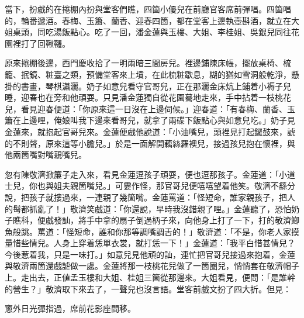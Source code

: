 當下，扮戲的在捲棚內扮與堂客們瞧，四箇小優兒在前廳官客席前彈唱。四箇唱的，輪番遞酒。春梅、玉簫、蘭香、迎春四箇，都在堂客上邊執壺斟酒，就立在大姐桌頭，同吃湯飯點心。吃了一回，潘金蓮與玉樓、大姐、李桂姐、吳銀兒同往花園裡打了回鞦韆。

原來捲棚後邊，西門慶收拾了一明兩暗三間房兒。裡邊鋪陳床帳，擺放桌椅、梳籠、抿鏡、粧臺之類，預備堂客來上墳，在此梳粧歇息，糊的猶如雪洞般乾淨，懸掛的書畫，琴棋瀟灑。奶子如意兒看守官哥兒，正在那灑金床炕上鋪着小褥子兒睡，迎春也在旁和他頑耍。只見潘金蓮獨自從花園驀地走來，手中拈着一枝桃花兒，{}看見迎春便道：「你原來這一日沒在上邊伺候。」迎春道：「有春梅、蘭香、玉簫在上邊哩，俺娘叫我下邊來看哥兒，就拿了兩碟下飯點心與如意兒吃。」奶子見金蓮來，就抱起官哥兒來。金蓮便戲他說道：「小油嘴兒，頭裡見打起鑼鼓來，諕的不則聲，原來這等小膽兒。」於是一面解開藕絲羅襖兒，接過孩兒抱在懷裡，與他兩箇嘴對嘴親嘴兒。

忽有陳敬濟掀簾子走入來，看見金蓮逗孩子頑耍，便也逗那孩子。金蓮道：「小道士兒，你也與姐夫親箇嘴兒。」可霎作怪，那官哥兒便嘻嘻望着他笑。{}敬濟不繇分說，把孩子就摟過來，一連親了幾箇嘴。金蓮罵道：「怪短命，誰家親孩子，把人的髩都抓亂了！」敬濟笑戲道：「你還說，早時我沒錯親了哩。」{}金蓮聽了，恐怕奶子瞧科，便戲發訕，將手中拿的扇子倒過柄子來，向他身上打了一下，打的敬濟鯽魚般跳。罵道：「怪短命，誰和你那等調嘴調舌的！」敬濟道：「不是，你老人家摸量惜些情兒。人身上穿着恁單衣裳，就打恁一下！」金蓮道：「我平白惜甚情兒？今後惹着我，只是一味打。」{}如意兒見他頑的訕，連忙把官哥兒接過來抱着，金蓮與敬濟兩箇還戲謔做一處。金蓮將那一枝桃花兒做了一箇圈兒，悄悄套在敬濟帽子上。{}走出去，正値孟玉樓和大姐、桂姐三箇從那邊來。大姐看見，便問：「是誰幹的營生？」敬濟取下來去了，一聲兒也沒言語。堂客前戲文扮了四大折。但見：

\begin{myquote}
窻外日光彈指過，席前花影座間移。
\end{myquote}

